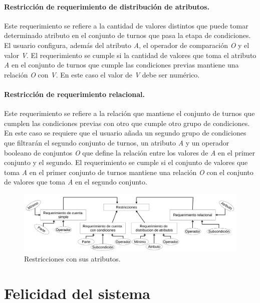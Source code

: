 \paragraph{Restricción de requerimiento de distribución de atributos.} Este requerimiento se refiere a la cantidad de valores distintos que puede tomar determinado atributo en el conjunto de turnos que pasa la etapa de condiciones. El usuario configura, además del atributo \textit{A}, el operador de comparación \textit{O} y el valor \textit{V}. El requerimiento se cumple si la cantidad de valores que toma el atributo \textit{A} en el conjunto de turnos que cumple las condiciones previas mantiene una relación \textit{O} con  \textit{V}. En este caso el valor de \textit{V} debe ser numérico.

\paragraph{Restricción de requerimiento relacional.} Este requerimiento se refiere a la relación que mantiene el conjunto de turnos que cumplen las condiciones previas con otro que cumple otro grupo de condiciones. En este caso se requiere que el usuario añada un segundo grupo de condiciones que filtrarán el segundo conjunto de turnos, un atributo \textit{A} y un operador booleano de conjuntos \textit{O} que define la relación entre los valores de \textit{A}
en el primer conjunto y el segundo. El requerimiento se cumple si el conjunto de valores que toma \textit{A} en el primer conjunto de turnos mantiene una relación \textit{O} con el conjunto de valores que toma \textit{A} en el segundo conjunto.

\begin{figure}[h!]
	\centering
	\includegraphics[width=0.95\linewidth]{images/Chapter 2/restrictions}
	\caption{Restricciones con sus atributos.}
	\label{fig:restrictions}
\end{figure}


\section{Felicidad del sistema}
\label{sec:happiness}

